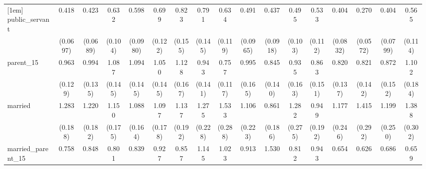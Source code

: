 {\begin{tabular}{l*{16}{c}}
[1em]
public\_servant      &       0.418\sym{***}&       0.423\sym{***}&       0.632\sym{**} &       0.598\sym{**} &       0.699\sym{*}  &       0.823         &       0.791         &       0.634\sym{*}  &       0.491\sym{***}&       0.437\sym{***}&       0.495\sym{***}&       0.533\sym{**} &       0.404\sym{***}&       0.270\sym{***}&       0.404\sym{***}&       0.565\sym{**} \\
                    &    (0.0697)         &    (0.0689)         &     (0.104)         &    (0.0980)         &     (0.122)         &     (0.155)         &     (0.145)         &     (0.119)         &    (0.0965)         &    (0.0918)         &     (0.103)         &     (0.112)         &    (0.0832)         &    (0.0572)         &    (0.0799)         &     (0.114)         \\
[1em]
parent\_15           &       0.963         &       0.994         &       1.087         &       1.094         &       1.050         &       1.128         &       0.943         &       0.757         &       0.995         &       0.845         &       0.935         &       0.863         &       0.820         &       0.821         &       0.872         &       1.102         \\
                    &     (0.129)         &     (0.135)         &     (0.145)         &     (0.145)         &     (0.145)         &     (0.167)         &     (0.141)         &     (0.117)         &     (0.165)         &     (0.140)         &     (0.163)         &     (0.151)         &     (0.137)         &     (0.142)         &     (0.152)         &     (0.184)         \\
[1em]
married             &       1.283         &       1.220         &       1.150         &       1.088         &       1.097         &       1.137         &       1.275         &       1.533\sym{*}  &       1.106         &       0.861         &       1.282         &       0.949         &       1.177         &       1.415         &       1.199         &       1.388         \\
                    &     (0.188)         &     (0.182)         &     (0.175)         &     (0.164)         &     (0.178)         &     (0.192)         &     (0.228)         &     (0.288)         &     (0.223)         &     (0.186)         &     (0.275)         &     (0.192)         &     (0.246)         &     (0.292)         &     (0.250)         &     (0.302)         \\
[1em]
married\_parent\_15   &       0.758         &       0.848         &       0.801         &       0.839         &       0.927         &       0.857         &       1.145         &       1.023         &       0.913         &       1.530         &       0.812         &       0.943         &       0.654         &       0.626         &       0.686         &       0.659         \\

\end{tabular}}
